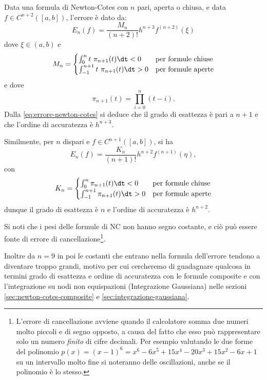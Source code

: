 \begin{theorem}
Data una formula di Newton-Cotes con $n$ pari, aperta o chiusa, e data $f\in C^{n+2}([ a,b])$, l'errore è dato da:
\begin{equation}
E_{n}(f) =\frac{M_{n}}{( n+2) !} h^{n+3} f^{( n+2)}( \xi )
\label{eq:errore-newton-cotes}
\end{equation}
dove $\xi \in ( a,b)$ e
\begin{equation*}
M_{n} =\begin{cases}
\int^{n}_{0} t\ \pi _{n+1}(t) \dt< 0 & \text{per formule chiuse}\\
\int^{n+1}_{-1} t\ \pi _{n+1}(t) \dt >0 & \text{per formule aperte}
\end{cases}
\end{equation*}
e dove
$$\pi _{n+1}(t) =\prod\limits ^{n}_{i=0}( t-i).$$
Dalla \eqref{eq:errore-newton-cotes} si deduce che il grado di esattezza è pari a $n+1$ e che l'ordine di accuratezza è $h^{n+3}$.

Similmente, per $n$ dispari e $f\in C^{n+1}([ a,b])$, si ha
\begin{equation}
E_{n}(f) =\frac{K_{n}}{( n+1) !} h^{n+2} f^{( n+1)}( \eta ),
\label{eq:errore-newton-cotes2}
\end{equation}
con
\begin{equation*}
K_{n} =\begin{cases}
\int\nolimits ^{n}_{0} \pi _{n+1}(t) \dt< 0 & \text{per formule chiuse} \\
\int\nolimits ^{n+1}_{-1} \pi _{n+1}(t) \dt >0 & \text{per formule aperte}
\end{cases}
\end{equation*}
dunque il grado di esattezza è $n$ e l'ordine di accuratezza è $h^{n+2}$.
\end{theorem}
Si noti che i pesi delle formule di NC non hanno segno costante, e ciò può essere fonte di errore di cancellazione\footnote{L'errore di cancellazione avviene quando il calcolatore somma due numeri molto piccoli e di segno opposto, a causa del fatto che esso può rappresentare solo un numero \textit{finito} di cifre decimali. Per esempio valutando le due forme del polinomio $p( x) =( x-1)^{6} =x^{6} -6x^{5} +15x^{4} -20x^{3} +15x^{2} -6x+1$ su un intervallo molto fine si noteranno delle oscillazioni, anche se il polinomio è lo stesso.}.

Inoltre da $n=9$ in poi le costanti che entrano nella formula dell'errore tendono a diventare troppo grandi, motivo per cui cercheremo di guadagnare qualcosa in termini grado di esattezza e ordine di accuratezza con le formule composite e con l'integrazione su nodi non equispazioni (Integrazione Gaussiana) nelle sezioni \ref{sec:newton-cotes-composite} e \ref{sec:integrazione-gaussiana}.

